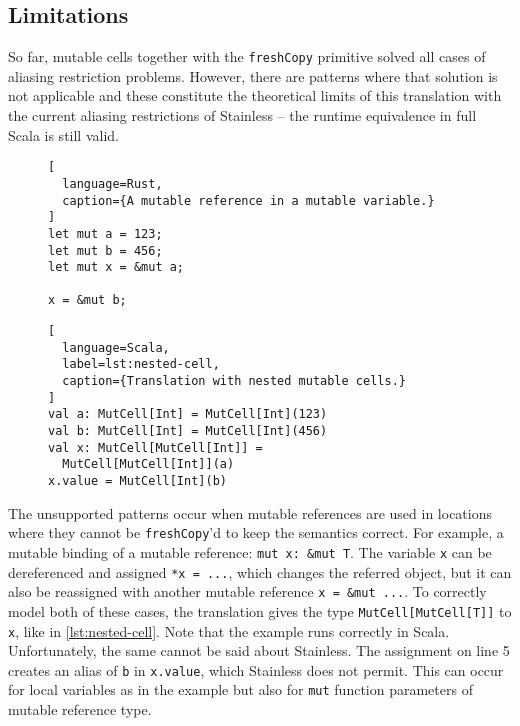 \subsection{Limitations}
\label{trans-limitations}

So far, mutable cells together with the \lstinline!freshCopy! primitive solved
all cases of aliasing restriction problems. However, there are patterns where
that solution is not applicable and these constitute the theoretical limits of
this translation with the current aliasing restrictions of Stainless -- the
runtime equivalence in full Scala is still valid.

\begin{figure}
\noindent\begin{minipage}[t]{.35\textwidth}
\begin{lstlisting}[
  language=Rust,
  caption={A mutable reference in a mutable variable.}
]
let mut a = 123;
let mut b = 456;
let mut x = &mut a;

x = &mut b;
\end{lstlisting}
\end{minipage}\hfill
\begin{minipage}[t]{.6\textwidth}
\begin{lstlisting}[
  language=Scala,
  label=lst:nested-cell,
  caption={Translation with nested mutable cells.}
]
val a: MutCell[Int] = MutCell[Int](123)
val b: MutCell[Int] = MutCell[Int](456)
val x: MutCell[MutCell[Int]] =
  MutCell[MutCell[Int]](a)
x.value = MutCell[Int](b)
\end{lstlisting}
\end{minipage}
\end{figure}

The unsupported patterns occur when mutable references are used in locations
where they cannot be \lstinline!freshCopy!'d to keep the semantics correct. For
example, a mutable binding of a mutable reference: \passthrough{\lstinline!mut
x: &mut T!}. The variable \lstinline!x! can be dereferenced and assigned
\lstinline!*x = ...!, which changes the referred object, but it can also be
reassigned with another mutable reference \lstinline!x = &mut ...!. To correctly
model both of these cases, the translation gives the type
\lstinline!MutCell[MutCell[T]]! to \lstinline!x!, like in
\autoref{lst:nested-cell}. Note that the example runs correctly in Scala.
Unfortunately, the same cannot be said about Stainless. The assignment on line 5
creates an alias of \lstinline!b! in \lstinline!x.value!, which Stainless does
not permit. This can occur for local variables as in the example but also for
\lstinline!mut! function parameters of mutable reference type.

